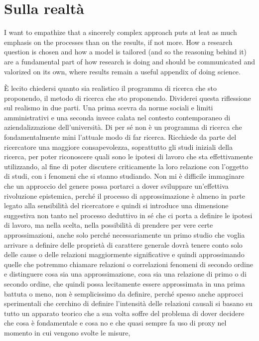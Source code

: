 \documentclass[a4paper, headings=standardclasses]{scrartcl}
\begin{document}
\section{Sulla realtà}
I want to empathize that a sincerely complex approach puts at leat as much emphasis on the processes than on the results, if not more. How a research question is chosen and how a model is tailored (and so the reasoning behind it) are a fundamental part of how research is doing and should be communicated and valorized on its own, where results remain a useful appendix of doing science.

È lecito chiedersi quanto sia realistico il programma di ricerca che sto proponendo,
il metodo di ricerca che sto proponendo.
Dividerei questa riflessione sul realismo in due parti.
Una prima scevra da norme sociali e limiti amministrativi e una seconda invece calata
nel contesto contemporaneo di aziendalizzazione dell'università.
Di per sé non è un programma di ricerca che fondamentalmente mini l'attuale modo
di far ricerca.
Ricchiede da parte del ricercatore una maggiore consapevolezza, soprattutto gli studi iniziali
della ricerca, per poter riconoscere quali sono le ipotesi di lavoro che sta effettivamente
utilizzando, al fine di poter discutere criticamente la loro relazione con l'oggetto di studi,
con i fenomeni che si stanno studiando.
Non mi è difficile immaginare che un approccio del genere possa portarci a dover sviluppare
un'effettiva rivoluzione epistemica, perché il processo di approssimazione è almeno
in parte legato alla sensibilità del ricercatore e quindi si introduce una dimensione suggestiva
non tanto nel processo deduttivo in sé che ci porta a definire le ipotesi di lavoro,
ma nella scelta, nella possibilità di prendere per vere certe approssimazioni, anche solo
perché necessariamente un primo studio che voglia arrivare a definire delle proprietà
di carattere generale dovrà tenere conto solo delle cause o delle relazioni maggiormente
significative e quindi approssimando quelle che potremmo chiamare relazioni o correlazioni
fenomeni di secondo ordine e distinguere cosa sia una approssimazione, cosa sia una relazione
di primo o di secondo ordine, che quindi possa lecitamente essere approssimata in una prima
battuta o meno, non è semplicissimo da definire, perché spesso anche approcci sperimentali
che cerchino di definire l'intensità delle relazioni causali si basano su tutto un apparato
teorico che a sua volta soffre del problema di dover decidere che cosa è fondamentale e cosa
no e che quasi sempre fa uso di proxy nel momento in cui vengono svolte le misure,
\end{document}
